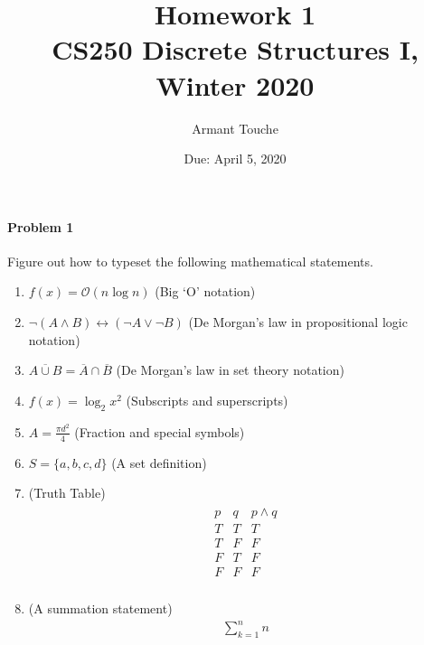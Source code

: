\documentclass[11pt, a4paper]{article}
\title{\bf Homework 1\\[1ex]
\rm\normalsize CS250 Discrete Structures I, Winter 2020 }
\date{\normalsize Due: April 5, 2020}
\author{\normalsize Armant Touche}
\begin{document}
 

\vspace{0cm}\maketitle 

\paragraph{Problem 1} Figure out how to typeset the following mathematical statements.

\begin{enumerate}

    \item $f(x) =  \mathcal{O}(n \log n)$ (Big `O' notation)

    \item $\neg(A \land B) \leftrightarrow (\neg A \lor \neg B)$ (De Morgan's law in propositional logic notation)

    \item $\overline{A \cup B} = \overline{A} \cap \overline{B}$ (De Morgan's law in set theory notation)

    \item $f(x) = \log_{2} x^{2}$ (Subscripts and superscripts)

    \item $A = \frac{\pi d^2}{4}$ (Fraction and special symbols)

    \item $S = \{a, b, c, d\}$ (A set definition)

    \item (Truth Table)
        \begin{align*} 
			\begin{array}{|c|c|c|} 
			p & q & p \land q\\ 
			\hline 			
            T & T & T\\
			T & F & F\\
			F & T & F\\
			F & F & F\\
			\end{array}
        \end{align*}
    \item (A summation statement)
		\begin{align*}
			\sum_{k=1}^{n}n 
		\end{align*}

\end{enumerate}
\end{document}
